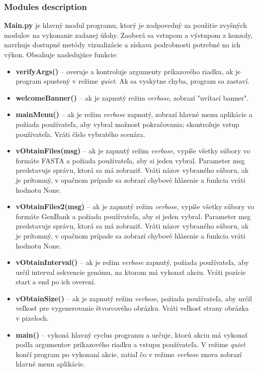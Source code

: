 \subsubsection{Modules description}
\textbf{\selectfont Main.py} je hlavný modul programu, ktorý je zodpovedný za použitie zvyšných modulov na vykonanie zadanej úlohy.
Zaoberá sa vstupom a výstupom z konzoly, navrhuje dostupné metódy vizualizácie a získava podrobnosti potrebné na ich výkon.
Obsahuje nasledujúce funkcie:
\begin{itemize}
  \item \textbf{\selectfont verifyArgs()} -- overuje a kontroluje argumenty príkazového riadku, ak je program spustený v režime \textit{quiet}. Ak sa vyskytne chyba, program sa zastaví.
  \item \textbf{\selectfont welcomeBanner()} -- ak je zapnutý režim \textit{verbose}, zobrazí "uvítací banner".
  \item \textbf{\selectfont mainMenu()} -- ak je režim \textit{verbose} zapnutý, zobrazí hlavné menu aplikácie a požiada používateľa, aby vybral možnosť pokračovania; skontroluje vstup používateľa. Vráti číslo vybratého scenára.
  \item \textbf{\selectfont vObtainFiles(msg)} -- ak je zapnutý režim \textit{verbose}, vypíše všetky súbory vo formáte {\selectfont FASTA} a požiada používateľa, aby si jeden vybral. Parameter {\selectfont msg} predstavuje správu, ktorá sa má zobraziť. Vráti názov vybraného súboru, ak je prítomný, v opačnom prípade sa zobrazí chybové hlásenie a funkcia vráti hodnotu {\selectfont None}.
  \item \textbf{\selectfont vObtainFiles2(msg)} -- ak je zapnutý režim \textit{verbose}, vypíše všetky súbory vo formáte {\selectfont GenBank} a požiada používateľa, aby si jeden vybral. Parameter {\selectfont msg} predstavuje správu, ktorá sa má zobraziť. Vráti názov vybraného súboru, ak je prítomný, v opačnom prípade sa zobrazí chybové hlásenie a funkcia vráti hodnotu {\selectfont None}.
  \item \textbf{\selectfont vObtainInterval()} -- ak je režim \textit{verbose} zapnutý, požiada používateľa, aby určil interval sekvencie genómu, na ktorom má vykonať akciu. Vráti pozície {\selectfont start} a {\selectfont end} po ich overení.
  \item \textbf{\selectfont vObtainSize()} -- ak je zapnutý režim \textit{verbose}, požiada používateľa, aby určil veľkosť pre vygenerovanie štvorcového obrázku. Vráti veľkosť strany obrázka v pixeloch.
  \item \textbf{\selectfont main()} -- vykoná hlavný cyclus programu a určuje, ktorú akciu má vykonať podľa argumentov príkazového riadku a vstupu používateľa. V režime \textit{quiet} končí program po vykonaní akcie, zatiaľ čo v režime \textit{verbose} znova zobrazí hlavné menu aplikácie.
\end{itemize}



